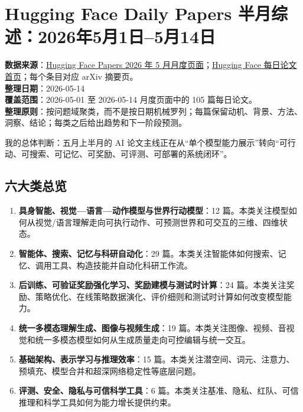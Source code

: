 
\section{Hugging Face Daily Papers 半月综述：2026年5月1日--5月14日}

\begin{conceptbox}
\textbf{数据来源}：\href{https://huggingface.co/papers/month/2026-05}{Hugging Face Papers 2026 年 5 月月度页面}；\href{https://huggingface.co/papers}{Hugging Face 每日论文首页}；每个条目对应 arXiv 摘要页。\\
\textbf{整理日期}：2026-05-14\\
\textbf{覆盖范围}：2026-05-01 至 2026-05-14 月度页面中的 105 篇每日论文。\\
\textbf{整理原则}：按问题域聚类，而不是按日期机械罗列；每篇保留动机、背景、方法、洞察、结论；每类之后给出趋势和下一阶段预测。
\end{conceptbox}

我的总体判断：五月上半月的 AI 论文主线正在从“单个模型能力展示”转向“可行动、可搜索、可记忆、可奖励、可评测、可部署的系统闭环”。

\subsection{六大类总览}
\begin{enumerate}[leftmargin=1.5em]
  \item \textbf{具身智能、视觉—语言—动作模型与世界行动模型}：12 篇。本类关注模型如何从视觉/语言理解走向可执行动作、可预测世界和可交互的三维、四维状态。
  \item \textbf{智能体、搜索、记忆与科研自动化}：29 篇。本类关注智能体如何搜索、记忆、调用工具、构造技能并自动化科研工作流。
  \item \textbf{后训练、可验证奖励强化学习、奖励建模与测试时计算}：24 篇。本类关注奖励、策略优化、在线策略数据演化、评价细则和测试时计算如何改变模型能力。
  \item \textbf{统一多模态理解生成、图像与视频生成}：19 篇。本类关注图像、视频、音视觉和统一多模态模型如何从生成质量走向可控编辑与统一交互。
  \item \textbf{基础架构、表示学习与推理效率}：15 篇。本类关注潜空间、词元、注意力、预填充、模型合并和超深网络稳定性等底层问题。
  \item \textbf{评测、安全、隐私与可信科学工具}：6 篇。本类关注基准、隐私、红队、可信推理和科学工具如何为能力增长提供约束。
\end{enumerate}

